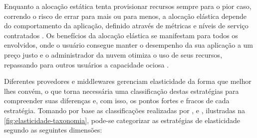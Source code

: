 \documentclass[english,brazilian]{UNISINOSmonografia} %
\begin{document}
Enquanto a alocação estática tenta provisionar recursos sempre para o pior caso, correndo o risco de errar para mais ou para menos, a alocação elástica depende do comportamento da aplicação, definido através de métricas e níveis de serviço contratados \cite{Righi2013}. 
Os benefícios da alocação elástica se manifestam para todos os envolvidos, onde o usuário consegue manter o desempenho da sua aplicação a um preço justo e o administrador da nuvem otimiza o uso de seus recursos, repassando para outros usuários a capacidade ociosa \cite{Raveendran2011,Righi2013,HennessyPatterson2013}.


Diferentes provedores e middlewares gerenciam elasticidade da forma que melhor lhes convém, o que torna necessária uma classificação destas estratégias para compreender suas diferenças e, com isso, os pontos fortes e fracos de cada estratégia.
Tomando por base as classificações realizadas por ,  e , ilustradas na \autoref{fig:elasticidade-taxonomia}, pode-se categorizar as estratégias de elasticidade segundo as seguintes dimensões:
\end{document}
